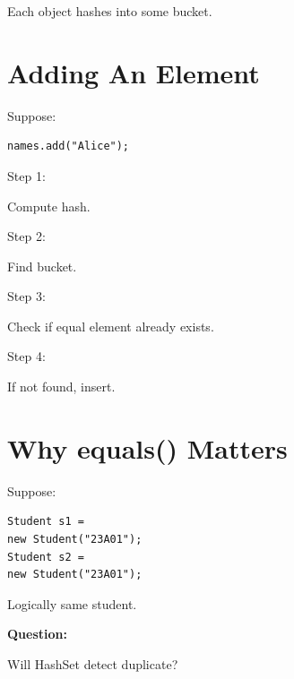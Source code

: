 \documentclass[11pt,a4paper]{book}
\begin{document}

Each object hashes into
some bucket.


\section{Adding An Element}

Suppose:

\begin{verbatim} 
names.add("Alice");
\end{verbatim}


Step 1:

Compute hash.


Step 2:

Find bucket.


Step 3:

Check if equal element
already exists.


Step 4:

If not found, insert.


\section{Why equals() Matters}

Suppose:

\begin{verbatim} 
Student s1 =
new Student("23A01");
Student s2 =
new Student("23A01");
\end{verbatim}


Logically same student.


\textbf{\textbf{Question:}}

Will HashSet detect duplicate?

\end{document}
